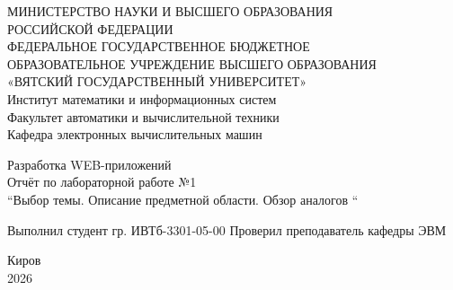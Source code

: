 \documentclass[oneside,a4paper,14pt]{extarticle}
\begin{document}
\newpage\thispagestyle{empty}
\begin{center}
	МИНИСТЕРСТВО НАУКИ И ВЫСШЕГО ОБРАЗОВАНИЯ\\
	РОССИЙСКОЙ ФЕДЕРАЦИИ\\
	ФЕДЕРАЛЬНОЕ ГОСУДАРСТВЕННОЕ БЮДЖЕТНОЕ\\
	ОБРАЗОВАТЕЛЬНОЕ УЧРЕЖДЕНИЕ ВЫСШЕГО ОБРАЗОВАНИЯ\\
	«ВЯТСКИЙ ГОСУДАРСТВЕННЫЙ УНИВЕРСИТЕТ»\\
	Институт математики и информационных систем\\
	Факультет автоматики и вычислительной техники\\
	Кафедра электронных вычислительных машин
\end{center}
\vspace{20mm}
\begin{center}
	Разработка WEB-приложений\\
	Отчёт по лабораторной работе №1\\
	“Выбор темы. Описание предметной области. Обзор аналогов “\\
\end{center}
\vfill
Выполнил студент гр. ИВТб-3301-05-00 \hfill
{}
Проверил преподаватель кафедры ЭВМ\hfill
{}
\vfill
\begin{center}
	Киров\\
	2026
\end{center}
\end{document}
